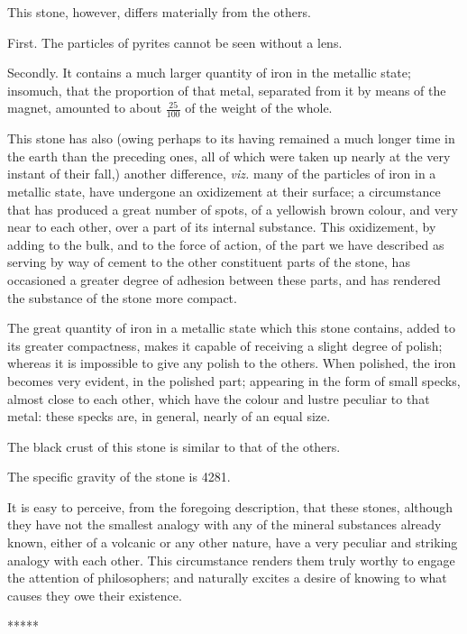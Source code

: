 \documentclass[a4paper, 12pt, oneside, twocolumn]{article}
\begin{document}
This stone, however, differs materially from the others.

First. The particles of pyrites cannot be seen without a lens.

Secondly. It contains a much larger quantity of iron in the metallic state; insomuch, that the proportion of that metal, separated from it by means of the magnet, amounted to about $\frac{25}{100}$ of the weight of the whole.

This stone has also (owing perhaps to its having remained a much longer time in the earth than the preceding ones, all of which were taken up nearly at the very instant of their fall,) another difference, \emph{viz.} many of the particles of iron in a metallic state, have undergone an oxidizement at their surface; a circumstance that has produced a great number of spots, of a yellowish brown colour, and very near to each other, over a part of its internal substance. This oxidizement, by adding to the bulk, and to the force of action, of the part we have described as serving by way of cement to the other constituent parts of the stone, has occasioned a greater degree of adhesion between these parts, and has rendered the substance of the stone more compact.

The great quantity of iron in a metallic state which this stone contains, added to its greater compactness, makes it capable of receiving a slight degree of polish; whereas it is impossible to give any polish to the others. When polished, the iron becomes very evident, in the polished part; appearing in the form of small specks, almost close to each other, which have the colour and lustre peculiar to that metal: these specks are, in general, nearly of an equal size.

The black crust of this stone is similar to that of the others.

The specific gravity of the stone is 4281.

It is easy to perceive, from the foregoing description, that these stones, although they have not the smallest analogy with any of the mineral substances already known, either of a volcanic or any other nature, have a very peculiar and striking analogy with each other. This circumstance renders them truly worthy to engage the attention of philosophers; and naturally excites a desire of knowing to what causes they owe their existence.

\centerline{*\hspace{15mm}*\hspace{15mm}*\hspace{15mm}*\hspace{15mm}*}
\bigskip
\end{document}
